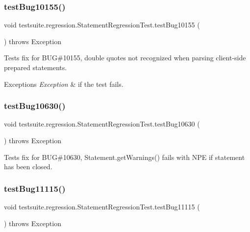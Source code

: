 \subsubsection{\texorpdfstring{test\+Bug10155()}{testBug10155()}}
{\footnotesize\ttfamily void testsuite.\+regression.\+Statement\+Regression\+Test.\+test\+Bug10155 (\begin{DoxyParamCaption}{ }\end{DoxyParamCaption}) throws Exception}

Tests fix for B\+UG\#10155, double quotes not recognized when parsing client-\/side prepared statements.


\begin{DoxyExceptions}{Exceptions}
{\em Exception} & if the test fails. \\
\hline
\end{DoxyExceptions}
\mbox{\label{classtestsuite_1_1regression_1_1_statement_regression_test_a5cd95ffb44229da2afd247495385088c}} 
\subsubsection{\texorpdfstring{test\+Bug10630()}{testBug10630()}}
{\footnotesize\ttfamily void testsuite.\+regression.\+Statement\+Regression\+Test.\+test\+Bug10630 (\begin{DoxyParamCaption}{ }\end{DoxyParamCaption}) throws Exception}

Tests fix for B\+UG\#10630, Statement.\+get\+Warnings() fails with N\+PE if statement has been closed. \mbox{\label{classtestsuite_1_1regression_1_1_statement_regression_test_a5eed5fd0591511a13f3159bd29366e80}} 
\subsubsection{\texorpdfstring{test\+Bug11115()}{testBug11115()}}
{\footnotesize\ttfamily void testsuite.\+regression.\+Statement\+Regression\+Test.\+test\+Bug11115 (\begin{DoxyParamCaption}{ }\end{DoxyParamCaption}) throws Exception}

